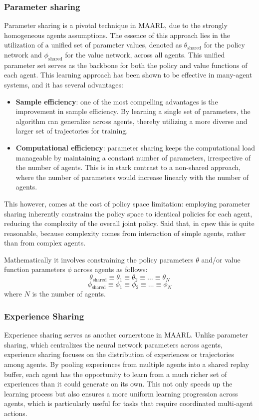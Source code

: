\subsubsection*{Parameter sharing}
Parameter sharing is a pivotal technique in \ac{MAARL}, 
 due to the strongly homogeneous agents assumptions. 
% 
The essence of this approach lies in the utilization of a unified set of parameter values, 
 denoted as \( \theta_{\text{shared}} \) for the policy network and \( \phi_{\text{shared}} \) 
 for the value network, across all agents. 
This unified parameter set serves as the backbone for both the policy and value functions of each agent.
This learning approach has been shown to be effective in many-agent systems, and it has several advantages:
\begin{itemize}
  \item \textbf{Sample efficiency}: 
  one of the most compelling advantages is the improvement in sample efficiency. 
  By learning a single set of parameters, 
  the algorithm can generalize across agents, 
  thereby utilizing a more diverse and larger set of trajectories for training.
  \item \textbf{Computational efficiency}: 
  parameter sharing keeps the computational load manageable by maintaining a constant number of parameters, 
  irrespective of the number of agents. 
  This is in stark contrast to a non-shared approach, 
  where the number of parameters would increase linearly with the number of agents.
\end{itemize}
This however, comes at the cost of policy space limitation: employing parameter sharing inherently constrains the policy space to identical policies for each agent, 
 reducing the complexity of the overall joint policy.
 Said that, in \ac{cpsw} this is quite reasonable,
 because complexity comes from interaction of simple agents,
  rather than from complex agents.
 
Mathematically it involves constraining the policy parameters \( \theta \) and/or value function parameters \( \phi \) across agents as follows:
\[
\theta_{\text{shared}} \equiv \theta_1 \equiv \theta_2 \equiv \ldots \equiv \theta_N
\]
\[
\phi_{\text{shared}} \equiv \phi_1 \equiv \phi_2 \equiv \ldots \equiv \phi_N
\]
where \( N \) is the number of agents.

\subsubsection*{Experience Sharing}
Experience sharing serves as another cornerstone in \ac{MAARL}.
 Unlike parameter sharing, which centralizes the neural network parameters across agents, 
 experience sharing focuses on the distribution of experiences or trajectories among agents.
By pooling experiences from multiple agents into a shared replay buffer, 
 each agent has the opportunity to learn from a much richer set of experiences than it could generate on its own. 
 This not only speeds up the learning process but also ensures a more uniform learning progression across agents, which is particularly useful for tasks that require coordinated multi-agent actions.


